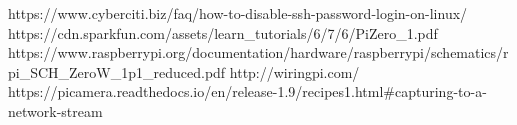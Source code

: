 

https://www.cyberciti.biz/faq/how-to-disable-ssh-password-login-on-linux/
https://cdn.sparkfun.com/assets/learn_tutorials/6/7/6/PiZero_1.pdf
https://www.raspberrypi.org/documentation/hardware/raspberrypi/schematics/rpi_SCH_ZeroW_1p1_reduced.pdf
http://wiringpi.com/
https://picamera.readthedocs.io/en/release-1.9/recipes1.html#capturing-to-a-network-stream


